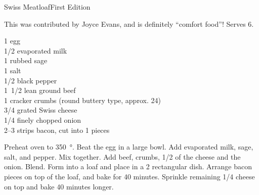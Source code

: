 \begin{entry}{Swiss Meatloaf}{First Edition}
\label{sec:swiss-meatloaf}

\begin{open}
  This was contributed by Joyce Evans, and is definitely ``comfort
  food''! Serves 6.
\end{open}
\begin{ingredients}
  1 egg \\
  \SI{1/2}{\cup} evaporated milk \\
  \SI{1}{\teaspoon} rubbed sage \\
  \SI{1}{\teaspoon} salt \\
  \SI{1/2}{\teaspoon} black pepper \\
  \SI{1/2}[1]{\pound} lean ground beef \\
  \SI{1}{\cup} cracker crumbs (round buttery type, approx. 24) \\
  \SI{3/4}{\cup} grated Swiss cheese \\
  \SI{1/4}{\cup} finely chopped onion \\
  \numrange{2}{3} strips bacon, cut into \SI{1}{\inch} pieces
\end{ingredients}
Preheat oven to \SI{350}{\degree}. Beat the egg in a large bowl. Add evaporated milk,
sage, salt, and pepper.  Mix together. Add beef, crumbs, \SI{1/2}{\cup} of the
cheese and the onion. Blend. Form into a loaf and place in a \SI{2}{\quart}
rectangular dish.  Arrange bacon pieces on top of the loaf, and bake for
40 minutes. Sprinkle remaining \SI{1/4}{\cup} cheese on top and bake
40 minutes longer.
\end{entry}

